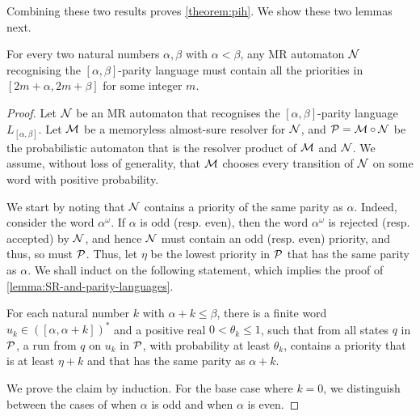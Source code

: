 Combining these two results proves \cref{theorem:pih}. We show these two lemmas next. 

\begin{lemma}\label{lemma:SR-and-parity-languages}
   For every two natural numbers $\alpha,\beta$ with $\alpha<\beta$, any MR automaton $\mathcal{N}$ recognising the $[\alpha,\beta]$-parity language must contain all the priorities in $[2m+\alpha,2m+\beta]$ for some integer $m$.
\end{lemma}
\begin{proof}
    Let $\mathcal{N}$ be an MR automaton that recognises the $[\alpha,\beta]$-parity language $L_{[\alpha,\beta]}$. Let $\mathcal{M}$ be a memoryless almost-sure resolver for $\mathcal{N}$, and $\mathcal{P} = \mathcal{M} \circ \mathcal{N}$ be the probabilistic automaton that is the resolver product of $\mathcal{M}$ and $\mathcal{N}$. We assume, without loss of generality, that $\mathcal{M}$ chooses every transition of $\mathcal{N}$ on some word with positive probability. 
    
 We start by noting that $\mathcal{N}$ contains a priority of the same parity as $\alpha$. Indeed, consider the word $\alpha^{\omega}$. If $\alpha$ is odd (resp. even), then the word $\alpha^{\omega}$ is rejected (resp. accepted) by $\mathcal{N}$, and hence $\mathcal{N}$ must contain an odd (resp. even) priority, and thus, so must $\mathcal{P}$. Thus, let $\eta$ be the lowest priority in $\mathcal{P}$ that has the same parity as $\alpha$. We shall induct on the following statement, which implies the proof of \cref{lemma:SR-and-parity-languages}.

    \begin{claim}[IH(k)]\label{claim:Ihk}
        For each natural number $k$ with $\alpha+k\leq \beta$, there is a finite word $u_k \in ([\alpha,\alpha+k])^{*}$ and a positive real $0<\theta_k\leq 1$, such that from all states $q$ in $\mathcal{P}$, a run from $q$ on $u_k$ in $\mathcal{P}$, with probability at least $\theta_k$, contains a priority that is at least $\eta+k$ and that has the same parity as $\alpha+k$.
    \end{claim} 
    
    We prove the claim by induction. For the base case where $k=0$, we distinguish between the cases of when $\alpha$ is odd and when $\alpha$ is even.
    

\end{proof}
